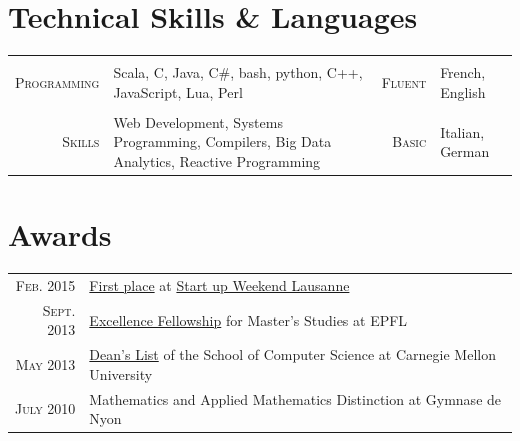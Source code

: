 \documentclass[a4paper,11pt]{article} %
\begin{document}

\section{Technical Skills \& Languages}
\begin{center}

\vspace{-0.3cm}
\begin{tabularx}{\textwidth}{rX|rl}

& & & \\
\textsc{\large{Programming}} & Scala, C, Java, C\#, bash, python, C++, JavaScript,
Lua, Perl &
\textsc{\large{Fluent}} & French, English \\
& & & \\
\textsc{\large{Skills}} & Web Development, Systems Programming, Compilers, Big
Data Analytics, Reactive Programming&
\textsc{\large{Basic}} & Italian, German \\

\end{tabularx}

\end{center}

\pagebreak
{}



\section{Awards}

\begin{tabular}{rl}

\textsc{Feb.} 2015 & 
\href{http://tasti.ch}{First place} at
\href{http://lausanne.startupweekend.org/}{Start up Weekend Lausanne}\\
\textsc{Sept.} 2013 & 
\href{http://master.epfl.ch/excellence-fellowships}{Excellence Fellowship} for Master's Studies at EPFL\\
\textsc{May} 2013 & 
\href{http://coursecatalog.web.cmu.edu/schoolofcomputerscience/#schoolofcomputersciencescsacademicstandardsandactions}{Dean's
List} of the School of Computer Science at Carnegie Mellon University\\
\textsc{July} 2010 & 
Mathematics and Applied Mathematics Distinction at Gymnase de Nyon\\
\end{tabular}
\end{document}
